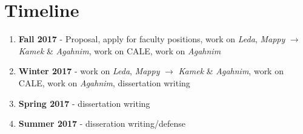 \documentclass[12pt]{report}
\begin{document}
\chapter*{Timeline}

\begin{enumerate}
\item \textbf{Fall 2017} - Proposal, apply for faculty positions, work on \textit{Leda}, \textit{Mappy} $\rightarrow$ \textit{Kamek} \& \textit{Agahnim}, work on CALE, work on \textit{Agahnim}
\item \textbf{Winter 2017} - work on \textit{Leda}, \textit{Mappy} $\rightarrow$ \textit{Kamek} \& \textit{Agahnim}, work on CALE, work on \textit{Agahnim}, dissertation writing
\item \textbf{Spring 2017} - dissertation writing
\item \textbf{Summer 2017} - disseration writing/defense

\end{enumerate}



\end{document}
